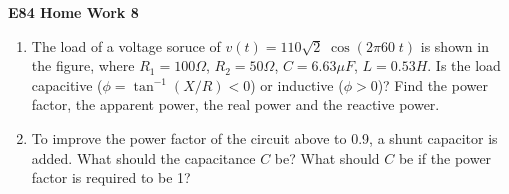 \usepackage{html}

\begin{center}
{\Large \bf E84 Home Work 8}
\end{center}
\begin{enumerate}

\item The load of a voltage soruce of $v(t)=110\sqrt{2} \;\cos(2\pi 60\;t)$
is shown in the figure, where $R_1=100\Omega$, $R_2=50\Omega$, $C=6.63\mu F$, 
$L=0.53 H$. Is the load capacitive ($\phi=\tan^{-1}(X/R)<0$) or inductive 
($\phi>0$)? Find the power factor, the apparent power, the real power and 
the reactive power. 


%  


\item To improve the power factor of the circuit above to 0.9, a shunt 
capacitor is added. What should the capacitance $C$ be? What should $C$ be 
if the power factor is required to be 1?


 


\end{enumerate}
